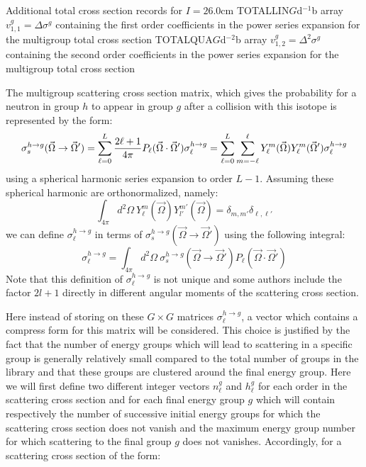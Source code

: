 \begin{DescriptionEnregistrement}{Additional total cross section records for $I=2$}{6.0cm}
\RealEnr
  {TOTALLIN}{$G$}{d$^{-1}$b}
  {array  $v_{1,1}^{g}=\Delta\sigma^{g}$ containing the first order coefficients in the power series expansion for the multigroup total
cross section}
\RealEnr
  {TOTALQUA}{$G$}{d$^{-2}$b}
  {array  $v_{1,2}^{g}=\Delta^{2}\sigma^{g}$ containing the second order coefficients in the power series expansion for the multigroup
total cross section}
\end{DescriptionEnregistrement}

\vskip 0.2cm

The multigroup scattering cross section matrix, which gives the probability for a
neutron in group $h$ to appear in group $g$ after a collision with this isotope
is represented by the form:
  \begin{displaymath}
    \sigma_{s}^{h\to g}(\vec{\Omega}\to\vec{\Omega}')
      =\sum_{\ell=0}^{L}{{2\ell+1}\over{4\pi}} P_{\ell}(\vec{\Omega}\cdot\vec{\Omega}')
    \sigma_{\ell}^{h\to g}
      =\sum_{\ell=0}^{L}\sum_{m=-\ell}^{\ell}
      Y_{\ell}^{m}(\vec{\Omega})Y_{\ell}^{m}(\vec{\Omega}')\sigma_{\ell}^{h\to g}
  \end{displaymath}
using a spherical harmonic series expansion to order $L-1$. Assuming these 
spherical harmonic are orthonormalized, namely:
  \begin{displaymath}
    \int_{4\pi} d^{2}\Omega \ Y_{\ell}^{m}(\vec{\Omega}) Y_{l'}^{m'}(\vec{\Omega})=
    \delta_{m,m'}\delta_{\ell,\ell'}
  \end{displaymath}
we can define $\sigma_{\ell}^{h\to g}$ in terms of $\sigma_{s}^{h\to
g}(\vec{\Omega}\to\vec{\Omega}')$ using the following integral:
  \begin{displaymath}
    \sigma_{\ell}^{h\to g}
      =\int_{4\pi}d^{2}\Omega \ \sigma_{s}^{h\to g}(\vec{\Omega}\to\vec{\Omega}')
     P_{\ell}(\vec{\Omega}\cdot\vec{\Omega}')
  \end{displaymath}
Note that this definition of $\sigma_{\ell}^{h\to g}$ is not unique and some authors
include the factor $2l+1$ directly in different angular moments of the 
scattering cross section.

\vskip 0.2cm

Here instead of storing on these $G\times G$
matrices $\sigma_{\ell}^{h\to g}$, a vector which contains a compress form for this
matrix will be considered. This choice is justified by the fact that the number
of energy groups which will lead to scattering in a specific group is generally
relatively small compared to the total number of groups in the library and that
these groups are clustered around the final energy group.
Here we will first define two different integer vectors $n_{\ell}^{g}$ and
$h_{\ell}^{g}$ for each order in the scattering cross section and for each final
energy group $g$ which will contain respectively the number of
successive initial energy groups for which the scattering cross section does
not vanish and the maximum energy group number for which scattering to the
final group $g$ does not vanishes. Accordingly, for a scattering cross section
of the form:

